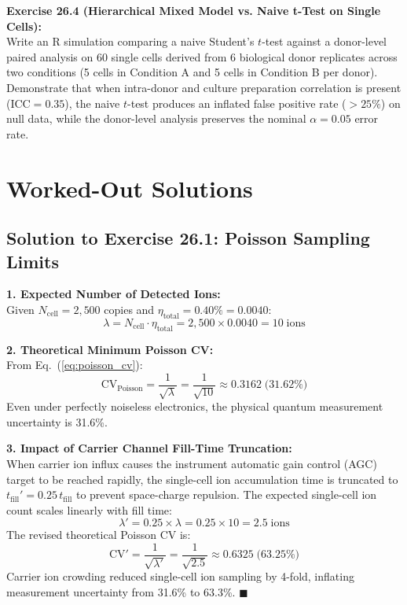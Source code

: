 \documentclass[11pt,twoside,openright]{book}
\begin{document}
\vspace{0.8em}
\noindent
\textbf{Exercise 26.4 (Hierarchical Mixed Model vs. Naive t-Test on Single Cells):}\\
Write an R simulation comparing a naive Student's $t$-test against a donor-level paired analysis on 60 single cells derived from 6 biological donor replicates across two conditions (5 cells in Condition A and 5 cells in Condition B per donor). Demonstrate that when intra-donor and culture preparation correlation is present ($\text{ICC} = 0.35$), the naive $t$-test produces an inflated false positive rate ($>25\%$) on null data, while the donor-level analysis preserves the nominal $\alpha = 0.05$ error rate.

\section{Worked-Out Solutions}

\subsection{Solution to Exercise 26.1: Poisson Sampling Limits}
\label{sec:sol_26_1}

\textbf{1. Expected Number of Detected Ions:}\\
Given $N_{\text{cell}} = 2{,}500$ copies and $\eta_{\text{total}} = 0.40\% = 0.0040$:
\begin{equation}
\lambda = N_{\text{cell}} \cdot \eta_{\text{total}} = 2{,}500 \times 0.0040 = 10 \;\text{ions}
\end{equation}

\textbf{2. Theoretical Minimum Poisson CV:}\\
From Eq.~(\ref{eq:poisson_cv}):
\begin{equation}
\text{CV}_{\text{Poisson}} = \frac{1}{\sqrt{\lambda}} = \frac{1}{\sqrt{10}} \approx 0.3162 \;\text{(31.62\%)}
\end{equation}
Even under perfectly noiseless electronics, the physical quantum measurement uncertainty is 31.6\%.

\textbf{3. Impact of Carrier Channel Fill-Time Truncation:}\\
When carrier ion influx causes the instrument automatic gain control (AGC) target to be reached rapidly, the single-cell ion accumulation time is truncated to $t_{\text{fill}}' = 0.25 \, t_{\text{fill}}$ to prevent space-charge repulsion. The expected single-cell ion count scales linearly with fill time:
\begin{equation}
\lambda' = 0.25 \times \lambda = 0.25 \times 10 = 2.5 \;\text{ions}
\end{equation}
The revised theoretical Poisson CV is:
\begin{equation}
\text{CV}' = \frac{1}{\sqrt{\lambda'}} = \frac{1}{\sqrt{2.5}} \approx 0.6325 \;\text{(63.25\%)}
\end{equation}
Carrier ion crowding reduced single-cell ion sampling by 4-fold, inflating measurement uncertainty from 31.6\% to 63.3\%. \hfill $\blacksquare$
\end{document}
